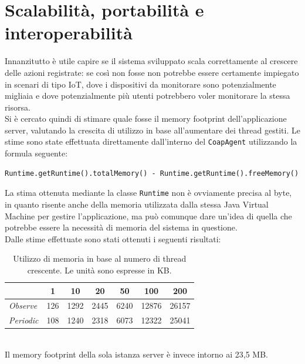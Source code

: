 \section{Scalabilità, portabilità e interoperabilità}
Innanzitutto è utile capire se il sistema sviluppato scala correttamente al crescere delle azioni registrate: se così non fosse non potrebbe essere certamente impiegato in scenari di tipo IoT, dove i dispositivi da monitorare sono potenzialmente migliaia e dove potenzialmente più utenti potrebbero voler monitorare la stessa risorsa.
\\Si è cercato quindi di stimare quale fosse il memory footprint dell'applicazione server, valutando la crescita di utilizzo in base all'aumentare dei thread gestiti. Le stime sono state effettuata direttamente dall'interno del {\tt CoapAgent} utilizzando la formula seguente:
\lstset{title=Calcolo della memoria in utilizzo dalla JVM}
\begin{lstlisting}
Runtime.getRuntime().totalMemory() - Runtime.getRuntime().freeMemory()
\end{lstlisting}
\vspace{0.50cm}
La stima ottenuta mediante la classe {\tt Runtime} non è ovviamente precisa al byte, in quanto risente anche della memoria utilizzata dalla stessa Java Virtual Machine per gestire l'applicazione, ma può comunque dare un'idea di quella che potrebbe essere la necessità di memoria del sistema in questione.
\\Dalle stime effettuate sono stati ottenuti i seguenti risultati:
\begin{table}[h]
\centering
\caption{Utilizzo di memoria in base al numero di thread crescente. Le unità sono espresse in KB.}
\vspace{0.5cm}
\label{my-label}
\begin{tabular}{|l||c|c|c|c|c|c|}
\hline
 & 1 & 10 & 20 & 50 & 100 & 200 \\
\hline
\emph{Observe} & 126 & 1292 & 2445 & 6240 & 12876 & 26157 \\
\hline
\emph{Periodic} & 108 & 1240 & 2318 & 6073 & 12322 & 25041 \\
\hline
\end{tabular}
\end{table}
\\Il memory footprint della sola istanza server è invece intorno ai 23,5 MB.

